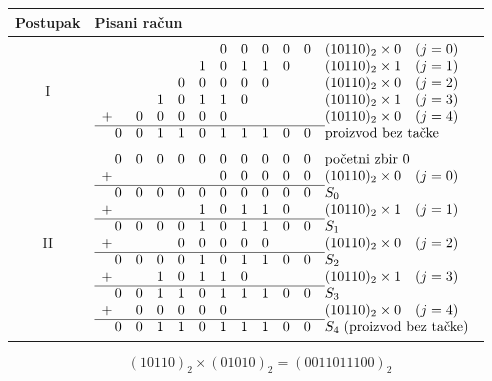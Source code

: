 \documentclass[a4paper,11pt]{article}
\numberwithin{equation}{section}
\renewcommand{\arraystretch}{1.25}
\newcommand{\redlinija}{\arrayrulecolor{black!28}\specialrule{0.3pt}{2pt}{2pt}\arrayrulecolor{black}}
\begin{document}
\par\addvspace{\medskipamount}\noindent\begin{minipage}{\linewidth}
\centering\captionsetup{type=table}
\caption{Množenje neoznačenih brojeva: $(10110)_{2}\times (01010)_{2}$.}\label{tab:postupak-8}
\begingroup\small\setlength{\arraycolsep}{2pt}\renewcommand{\arraystretch}{1.02}
\begin{tabular}{@{}cl@{}}\toprule
Postupak & Pisani račun\\\midrule
I & $\begin{array}[t]{r@{\,}*{10}{c}@{\quad}l}
 &  &  &  &  &  & 0 & 0 & 0 & 0 & 0 & (10110)_2\times 0\quad(j=0) \\
 &  &  &  &  & 1 & 0 & 1 & 1 & 0 &  & (10110)_2\times 1\quad(j=1) \\
 &  &  &  & 0 & 0 & 0 & 0 & 0 &  &  & (10110)_2\times 0\quad(j=2) \\
 &  &  & 1 & 0 & 1 & 1 & 0 &  &  &  & (10110)_2\times 1\quad(j=3) \\
+ &  & 0 & 0 & 0 & 0 & 0 &  &  &  &  & (10110)_2\times 0\quad(j=4) \\
\cline{1-11}
 & 0 & 0 & 1 & 1 & 0 & 1 & 1 & 1 & 0 & 0 & \text{proizvod bez tačke} \\
\end{array}$\quad\\[5pt]
\redlinija
II & $\begin{array}[t]{r@{\,}*{10}{c}@{\quad}l}
 & 0 & 0 & 0 & 0 & 0 & 0 & 0 & 0 & 0 & 0 & \text{početni zbir }0 \\
+ &  &  &  &  &  & 0 & 0 & 0 & 0 & 0 & (10110)_2\times 0\quad(j=0) \\
\cline{1-11}
 & 0 & 0 & 0 & 0 & 0 & 0 & 0 & 0 & 0 & 0 & S_0 \\
+ &  &  &  &  & 1 & 0 & 1 & 1 & 0 &  & (10110)_2\times 1\quad(j=1) \\
\cline{1-11}
 & 0 & 0 & 0 & 0 & 1 & 0 & 1 & 1 & 0 & 0 & S_1 \\
+ &  &  &  & 0 & 0 & 0 & 0 & 0 &  &  & (10110)_2\times 0\quad(j=2) \\
\cline{1-11}
 & 0 & 0 & 0 & 0 & 1 & 0 & 1 & 1 & 0 & 0 & S_2 \\
+ &  &  & 1 & 0 & 1 & 1 & 0 &  &  &  & (10110)_2\times 1\quad(j=3) \\
\cline{1-11}
 & 0 & 0 & 1 & 1 & 0 & 1 & 1 & 1 & 0 & 0 & S_3 \\
+ &  & 0 & 0 & 0 & 0 & 0 &  &  &  &  & (10110)_2\times 0\quad(j=4) \\
\cline{1-11}
 & 0 & 0 & 1 & 1 & 0 & 1 & 1 & 1 & 0 & 0 & S_4\;\text{(proizvod bez tačke)} \\
\end{array}$\quad\\[5pt]
\bottomrule\end{tabular}\endgroup
\begin{equation}\label{eq:racun-1}
(10110)_{2}\times (01010)_{2}=(0011011100)_{2}
\end{equation}
\end{minipage}
\end{document}
